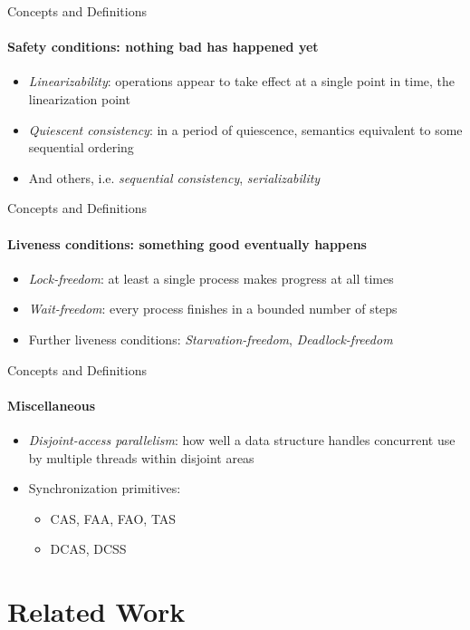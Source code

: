 \documentclass[usenames,dvipsnames]{beamer}
\begin{document}
\begin{frame}{Concepts and Definitions}
\framesubtitle{Safety conditions: nothing bad has happened yet}

\begin{itemize}
\item \emph{Linearizability}: operations appear to take effect at a single point in time, the linearization point
\item \emph{Quiescent consistency}: in a period of quiescence, semantics equivalent to some sequential ordering
\item And others, i.e. \emph{sequential consistency}, \emph{serializability}
\end{itemize}
\end{frame}

\begin{frame}{Concepts and Definitions}
\framesubtitle{Liveness conditions: something good eventually happens}

\begin{itemize}
\item \emph{Lock-freedom}: at least a single process makes progress at all times
\item \emph{Wait-freedom}: every process finishes in a bounded number of steps
\item Further liveness conditions: \emph{Starvation-freedom}, \emph{Deadlock-freedom}
\end{itemize}
\end{frame}

\begin{frame}{Concepts and Definitions}
\framesubtitle{Miscellaneous}

\begin{itemize}
\item \emph{Disjoint-access parallelism}: how well a data structure handles concurrent use by multiple
      threads within disjoint areas
\item Synchronization primitives:
    \begin{itemize}
    \item \ac{CAS}, \ac{FAA}, \ac{FAO}, \ac{TAS}
    \item \ac{DCAS}, \ac{DCSS}
    \end{itemize}
\end{itemize}
\end{frame}

\section{Related Work} \label{sec:related}
\end{document}
